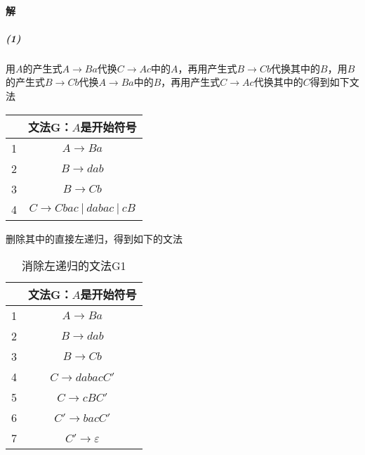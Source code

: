 \documentclass{article}
\begin{document}
\paragraph{解}
\subparagraph{(1)}
用$A$的产生式$A \rightarrow Ba$代换$C \rightarrow Ac$中的$A$，再用产生式$B \rightarrow Cb$代换其中的$B$，用$B$的产生式$B \rightarrow Cb$代换$A \rightarrow Ba$中的$B$，再用产生式$C \rightarrow Ac$代换其中的$C$得到如下文法
\begin{table}[H]
    \centering
    \begin{tabular}{|c|c|}
        \hline
        & 文法G：$A$是开始符号 \\ \hline
        1 & $A \rightarrow Ba$ \\ \hline
        2 & $B \rightarrow dab$ \\ \hline
        3 & $B \rightarrow Cb$ \\ \hline
        4 & $C \rightarrow Cbac\ |\ dabac\ |\ cB$ \\ \hline
    \end{tabular}
\end{table}
删除其中的直接左递归，得到如下的文法
\begin{table}[H]
    \centering
    \caption{消除左递归的文法G1}
    \label{table:2}
    \begin{tabular}{|c|c|}
        \hline
        & 文法G：$A$是开始符号 \\ \hline
        1 & $A \rightarrow Ba$ \\ \hline
        2 & $B \rightarrow dab$ \\ \hline
        3 & $B \rightarrow Cb$ \\ \hline
        4 & $C \rightarrow dabacC'$ \\ \hline
        5 & $C \rightarrow cBC'$ \\ \hline
        6 & $C' \rightarrow bacC'$ \\ \hline
        7 & $C' \rightarrow \varepsilon$ \\ \hline
    \end{tabular}
\end{table}
\end{document}
